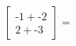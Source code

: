 \documentclass[preview]{standalone}
\begin{document}
\begin{align*}
\begin{bmatrix} \text{-}1 + \text{-}2 \\ 2 + \text{-}3 \end{bmatrix}=
\end{align*}
\end{document}
